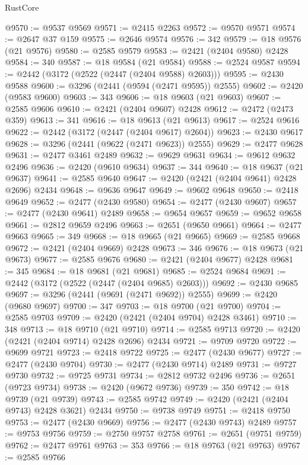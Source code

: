 \begin{lexlean}{RustCore}
\begin{coremodule}
@9570 := @9537 @9569
@9571 := @2415 @2263
@9572 := @9570 @9571
@9574 := @2647 @37 @159
@9575 := @2646 @9574
@9576 := 342
@9579 := @18 @9576 (@21 @9576)
@9580 := @2585 @9579
@9583 := @2421 (@2404 @9580) @2428
@9584 := 340
@9587 := @18 @9584 (@21 @9584)
@9588 := @2524 @9587
@9594 := @2442 (@3172 (@2522 (@2447 (@2404 @9588) @2603)))
@9595 := @2430 @9588
@9600 := @3296 (@2441 (@9594 (@2471 @9595)) @2555)
@9602 := @2420 (@9583 @9600)
@9603 := 343
@9606 := @18 @9603 (@21 @9603)
@9607 := @2585 @9606
@9610 := @2421 (@2404 @9607) @2428
@9612 := @2472 (@2473 @359)
@9613 := 341
@9616 := @18 @9613 (@21 @9613)
@9617 := @2524 @9616
@9622 := @2442 (@3172 (@2447 (@2404 @9617) @2604))
@9623 := @2430 @9617
@9628 := @3296 (@2441 (@9622 (@2471 @9623)) @2555)
@9629 := @2477 @9628
@9631 := @2477 @3461 @2489
@9632 := @9629 @9631
@9634 := @9612 @9632 @2496
@9636 := @2420 (@9610 @9634)
@9637 := 344
@9640 := @18 @9637 (@21 @9637)
@9641 := @2585 @9640
@9647 := @2420 (@2421 (@2404 @9641) @2428 @2696) @2434
@9648 := @9636 @9647
@9649 := @9602 @9648
@9650 := @2418 @9649
@9652 := @2477 (@2430 @9580)
@9654 := @2477 (@2430 @9607)
@9657 := @2477 (@2430 @9641) @2489
@9658 := @9654 @9657
@9659 := @9652 @9658
@9661 := @2812 @9659 @2496
@9663 := @2651 (@9650 @9661)
@9664 := @2477 @9663
@9665 := 349
@9668 := @18 @9665 (@21 @9665)
@9669 := @2585 @9668
@9672 := @2421 (@2404 @9669) @2428
@9673 := 346
@9676 := @18 @9673 (@21 @9673)
@9677 := @2585 @9676
@9680 := @2421 (@2404 @9677) @2428
@9681 := 345
@9684 := @18 @9681 (@21 @9681)
@9685 := @2524 @9684
@9691 := @2442 (@3172 (@2522 (@2447 (@2404 @9685) @2603)))
@9692 := @2430 @9685
@9697 := @3296 (@2441 (@9691 (@2471 @9692)) @2555)
@9699 := @2420 (@9680 @9697)
@9700 := 347
@9703 := @18 @9700 (@21 @9700)
@9704 := @2585 @9703
@9709 := @2420 (@2421 (@2404 @9704) @2428 @3461)
@9710 := 348
@9713 := @18 @9710 (@21 @9710)
@9714 := @2585 @9713
@9720 := @2420 (@2421 (@2404 @9714) @2428 @2696) @2434
@9721 := @9709 @9720
@9722 := @9699 @9721
@9723 := @2418 @9722
@9725 := @2477 (@2430 @9677)
@9727 := @2477 (@2430 @9704)
@9730 := @2477 (@2430 @9714) @2489
@9731 := @9727 @9730
@9732 := @9725 @9731
@9734 := @2812 @9732 @2496
@9736 := @2651 (@9723 @9734)
@9738 := @2420 (@9672 @9736)
@9739 := 350
@9742 := @18 @9739 (@21 @9739)
@9743 := @2585 @9742
@9749 := @2420 (@2421 (@2404 @9743) @2428 @3621) @2434
@9750 := @9738 @9749
@9751 := @2418 @9750
@9753 := @2477 (@2430 @9669)
@9756 := @2477 (@2430 @9743) @2489
@9757 := @9753 @9756
@9759 := @2750 @9757 @2758
@9761 := @2651 (@9751 @9759)
@9762 := @2477 @9761
@9763 := 353
@9766 := @18 @9763 (@21 @9763)
@9767 := @2585 @9766

\end{coremodule}
\end{lexlean}
